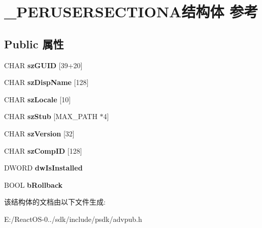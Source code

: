 \hypertarget{struct___p_e_r_u_s_e_r_s_e_c_t_i_o_n_a}{}\section{\+\_\+\+P\+E\+R\+U\+S\+E\+R\+S\+E\+C\+T\+I\+O\+N\+A结构体 参考}
\label{struct___p_e_r_u_s_e_r_s_e_c_t_i_o_n_a}
\subsection*{Public 属性}
\begin{DoxyCompactItemize}
\item 
\mbox{\label{struct___p_e_r_u_s_e_r_s_e_c_t_i_o_n_a_ac4169a741e0a8a778c18edeacc24922f}} 
C\+H\+AR {\bfseries sz\+G\+U\+ID} \mbox{[}39+20\mbox{]}
\item 
\mbox{\label{struct___p_e_r_u_s_e_r_s_e_c_t_i_o_n_a_a3c35716294fecd6c35d26ce1e5a333b2}} 
C\+H\+AR {\bfseries sz\+Disp\+Name} \mbox{[}128\mbox{]}
\item 
\mbox{\label{struct___p_e_r_u_s_e_r_s_e_c_t_i_o_n_a_adfbde6b227526aa4eeb1de793fd44df6}} 
C\+H\+AR {\bfseries sz\+Locale} \mbox{[}10\mbox{]}
\item 
\mbox{\label{struct___p_e_r_u_s_e_r_s_e_c_t_i_o_n_a_ad0202339e5781fe66639cde488c6d575}} 
C\+H\+AR {\bfseries sz\+Stub} \mbox{[}M\+A\+X\+\_\+\+P\+A\+TH $\ast$4\mbox{]}
\item 
\mbox{\label{struct___p_e_r_u_s_e_r_s_e_c_t_i_o_n_a_a0b04d0d58f577f4226ba202756066ae5}} 
C\+H\+AR {\bfseries sz\+Version} \mbox{[}32\mbox{]}
\item 
\mbox{\label{struct___p_e_r_u_s_e_r_s_e_c_t_i_o_n_a_a99b908d5c5437a1386069d8e4232855a}} 
C\+H\+AR {\bfseries sz\+Comp\+ID} \mbox{[}128\mbox{]}
\item 
\mbox{\label{struct___p_e_r_u_s_e_r_s_e_c_t_i_o_n_a_a3f348119e621819c960b1618da959c9b}} 
D\+W\+O\+RD {\bfseries dw\+Is\+Installed}
\item 
\mbox{\label{struct___p_e_r_u_s_e_r_s_e_c_t_i_o_n_a_af344b06cb9e7e85e1cad336310083290}} 
B\+O\+OL {\bfseries b\+Rollback}
\end{DoxyCompactItemize}


该结构体的文档由以下文件生成\+:\begin{DoxyCompactItemize}
\item 
E\+:/\+React\+O\+S-\/0../sdk/include/psdk/advpub.\+h\end{DoxyCompactItemize}
